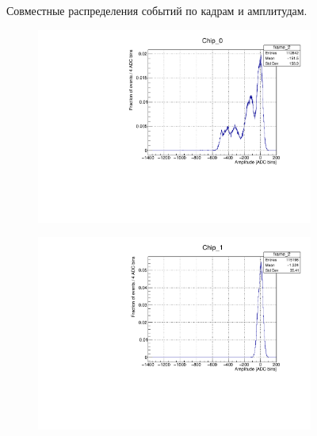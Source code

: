 \documentclass[12pt]{article}
\begin{document}
\begin{figure}[H]
\begin{subfigure}[b]{0.45\textwidth}
\end{subfigure}
\caption{Совместные распределения событий по кадрам и амплитудам.}
\label{fig:h2d}
\end{figure}
\begin{figure}[h!]
	\centering
	\begin{subfigure}[t]{0.45\textwidth}
		\centering
		\includegraphics[width=\textwidth]{Chip_0_amp_hist}
	\end{subfigure}
	\begin{subfigure}[t]{0.45\textwidth}
		\centering
		\includegraphics[width=\textwidth]{Chip_1_amp_hist}
	\end{subfigure}
	\begin{subfigure}[t]{0.45\textwidth}
		\centering

\end{subfigure}
\end{figure}
\end{document}
